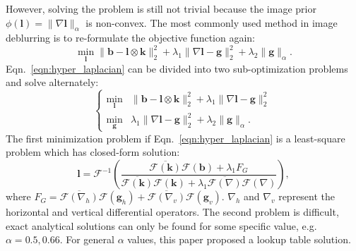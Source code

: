 \documentclass[journal, onecolumn, 10pt]{IEEEtran}
\begin{document}
However, solving the problem is still not trivial because the image prior $\phi(\mathbf{l}) = \|\nabla \mathbf{l}\|_{\alpha}$ is non-convex. The most commonly used method in image deblurring is to re-formulate the objective function again:
\begin{equation}
\min_{\mathbf{l}} \| \mathbf{b} - \mathbf{l} \otimes \mathbf{k} \|_2^2 + \lambda_1 \|\nabla \mathbf{l} - \mathbf{g}\|_2^2 + \lambda_2\|\mathbf{g}\|_{\alpha}.
\label{eqn:hyper_laplacian}
\end{equation}
Eqn.~\ref{eqn:hyper_laplacian} can be divided into two sub-optimization problems and solve alternately:
\begin{equation}
\begin{cases}
\min_{\mathbf{l}} &\| \mathbf{b} - \mathbf{l} \otimes \mathbf{k} \|_2^2 + \lambda_1 \|\nabla \mathbf{l} - \mathbf{g}\|_2^2 \\
\min_{\mathbf{g}} &\lambda_1\|\nabla \mathbf{l} - \mathbf{g}\|_2^2 + \lambda_2\|\mathbf{g}\|_{\alpha}.
\end{cases}
\label{eqn:hyper_laplacian_alter}
\end{equation}
The first minimization problem if Eqn.~\ref{eqn:hyper_laplacian} is a least-square problem which has closed-form solution:
\begin{equation}
\mathbf{l} = \mathcal{F}^{-1} \left( \frac{\overline{\mathcal{F}(\mathbf{k})}\mathcal{F}(\mathbf{b}) + \lambda_1F_G}
{\overline{\mathcal{F}(\mathbf{k})}\mathcal{F}(\mathbf{k}) + \lambda_1\overline{\mathcal{F}(\nabla)}\mathcal{F}(\nabla)} \right),
\label{eqn:l2_latent_close_form}
\end{equation}
where $F_G = \overline{\mathcal{F}(\nabla_h)}\mathcal{F}(\mathbf{g}_h) + \overline{\mathcal{F}(\nabla_v)}\mathcal{F}(\mathbf{g}_v)$. $\nabla_h$ and $\nabla_v$ represent the horizontal and vertical differential operators.
The second problem is difficult, exact analytical solutions can only be found for some specific value, e.g. $\alpha = 0.5, 0.66$. For general $\alpha$ values, this paper proposed a lookup table solution.
\end{document}

